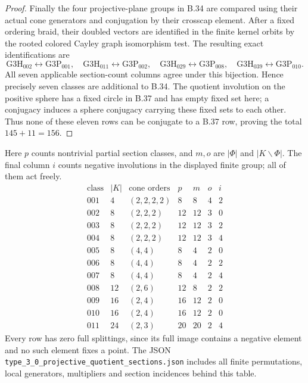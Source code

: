 \begin{proof}
Finally the four projective-plane groups in B.34 are compared using
their actual cone generators and conjugation by their crosscap
element.  After a fixed ordering braid, their doubled vectors are
identified in the finite kernel orbits by the rooted colored Cayley
graph isomorphism test.  The resulting exact identifications are
\[
 \mathrm{G3H}_{002}\leftrightarrow\mathrm{G3P}_{001},\quad
 \mathrm{G3H}_{011}\leftrightarrow\mathrm{G3P}_{002},\quad
 \mathrm{G3H}_{029}\leftrightarrow\mathrm{G3P}_{008},\quad
 \mathrm{G3H}_{039}\leftrightarrow\mathrm{G3P}_{010}.
                                                        \tag{B.39.7}
\]
All seven applicable section-count columns agree under this
bijection.  Hence precisely seven classes are additional to B.34.
The quotient involution on the positive sphere has a fixed circle
in B.37 and has empty fixed set here; a conjugacy induces a sphere
conjugacy carrying these fixed sets to each other.  Thus none of
these eleven rows can be conjugate to a B.37 row, proving the total
$145+11=156$.
\end{proof}

Here $p$ counts nontrivial partial section classes, and $m,o$ are
$|\Phi|$ and $|K\backslash\Phi|$.  The final column $i$ counts negative
involutions in the displayed finite group; all of them act freely.
\[
\begin{array}{c|r|l|r|r|r|r}
 \text{class}&|K|&\text{cone orders}&p&m&o&i\\\hline
 001&4&(2,2,2,2)&8&8&4&2\\
 002&8&(2,2,2)&12&12&3&0\\
 003&8&(2,2,2)&12&12&3&2\\
 004&8&(2,2,2)&12&12&3&4\\
 005&8&(4,4)&8&4&2&0\\
 006&8&(4,4)&8&4&2&2\\
 007&8&(4,4)&8&4&2&4\\
 008&12&(2,6)&12&8&2&2\\
 009&16&(2,4)&16&12&2&0\\
 010&16&(2,4)&16&12&2&0\\
 011&24&(2,3)&20&20&2&4
\end{array}                                             \tag{B.39.8}
\]
Every row has zero full splittings, since its full image contains a
negative element and no such element fixes a point.  The JSON
\texttt{type\_3\_0\_projective\_quotient\_sections.json} includes all
finite permutations, local generators, multipliers and section
incidences behind this table.
